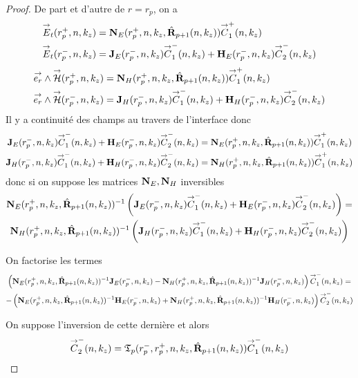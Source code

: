     \begin{proof}
      De part et d'autre de \(r=r_p\), on a 
      \begin{align*}
        {\overset{\rightarrow}{E}}_t(r_p^+,n,k_z) &= \mathbf{N}_{E}(r_p^+,n,k_z,\hat{\mathbf{R}}_{p+1}(n,k_z)){\overset{\rightarrow}{C}}_{1}^+(n,k_z)
        \\
        {\overset{\rightarrow}{E}}_t(r_p^-,n,k_z) &= \mathbf{J}_E(r_p^-,n,k_z){\overset{\rightarrow}{C}}_{1}^-(n,k_z) + \mathbf{H}_E(r_p^-,n,k_z){\overset{\rightarrow}{C}}_{2}^-(n,k_z)
      \end{align*}
      \begin{align*}
        {\overset{\rightarrow}{e_r}}\wedge{\overset{\rightarrow}{\mathcal{H}}}(r_p^+,n,k_z) &= \mathbf{N}_{H}(r_p^+,n,k_z,\hat{\mathbf{R}}_{p+1}(n,k_z)){\overset{\rightarrow}{C}}_{1}^+(n,k_z)
        \\
        {\overset{\rightarrow}{e_r}}\wedge{\overset{\rightarrow}{\mathcal{H}}}(r_p^-,n,k_z) &= \mathbf{J}_H(r_p^-,n,k_z){\overset{\rightarrow}{C}}_{1}^-(n,k_z) + \mathbf{H}_H(r_p^-,n,k_z){\overset{\rightarrow}{C}}_{2}^-(n,k_z)
      \end{align*}
      Il y a continuité des champs au travers de l'interface donc
      \begin{align*}
        \mathbf{J}_E(r_p^-,n,k_z){\overset{\rightarrow}{C}}_{1}^-(n,k_z) + \mathbf{H}_E(r_p^-,n,k_z){\overset{\rightarrow}{C}}_{2}^-(n,k_z) &= \mathbf{N}_{E}(r_p^+,n,k_z,\hat{\mathbf{R}}_{p+1}(n,k_z)){\overset{\rightarrow}{C}}_{1}^+(n,k_z)
        \\
        \mathbf{J}_H(r_p^-,n,k_z){\overset{\rightarrow}{C}}_{1}^-(n,k_z) + \mathbf{H}_H(r_p^-,n,k_z){\overset{\rightarrow}{C}}_{2}^-(n,k_z) &= \mathbf{N}_{H}(r_p^+,n,k_z,\hat{\mathbf{R}}_{p+1}(n,k_z)){\overset{\rightarrow}{C}}_{1}^+(n,k_z)
      \end{align*}
      donc si on suppose les matrices \(\mathbf{N}_E, \mathbf{N}_H\) inversibles
      \begin{multline*}
        \mathbf{N}_{E}(r_p^+,n,k_z,\hat{\mathbf{R}}_{p+1}(n,k_z))^{-1}\left(\mathbf{J}_E(r_p^-,n,k_z){\overset{\rightarrow}{C}}_{1}^-(n,k_z) + \mathbf{H}_E(r_p^-,n,k_z){\overset{\rightarrow}{C}}_{2}^-(n,k_z)\right) =
        \\
        \mathbf{N}_{H}(r_p^+,n,k_z,\hat{\mathbf{R}}_{p+1}(n,k_z))^{-1}\left(\mathbf{J}_H(r_p^-,n,k_z){\overset{\rightarrow}{C}}_{1}^-(n,k_z) + \mathbf{H}_H(r_p^-,n,k_z){\overset{\rightarrow}{C}}_{2}^-(n,k_z)\right)
      \end{multline*}

      On factorise les termes
      \begin{multline*}
        \left(\mathbf{N}_{E}(r_p^+,n,k_z,\hat{\mathbf{R}}_{p+1}(n,k_z))^{-1}\mathbf{J}_E(r_p^-,n,k_z) - \mathbf{N}_{H}(r_p^+,n,k_z,\hat{\mathbf{R}}_{p+1}(n,k_z))^{-1}\mathbf{J}_H(r_p^-,n,k_z)\right){\overset{\rightarrow}{C}}_{1}^-(n,k_z) =
        \\
        -\left(\mathbf{N}_{E}(r_p^+,n,k_z,\hat{\mathbf{R}}_{p+1}(n,k_z))^{-1}\mathbf{H}_E(r_p^-,n,k_z) + \mathbf{N}_{H}(r_p^+,n,k_z,\hat{\mathbf{R}}_{p+1}(n,k_z))^{-1}\mathbf{H}_H(r_p^-,n,k_z)\right){\overset{\rightarrow}{C}}_{2}^-(n,k_z)
      \end{multline*}

      On suppose l'inversion de cette dernière et alors
      \begin{equation*}
        {\overset{\rightarrow}{C}}_{2}^-(n,k_z) = \mathfrak{T}_p(r_p^-,r_p^+,n,k_z,\hat{\mathbf{R}}_{p+1}(n,k_z)) {\overset{\rightarrow}{C}}_{1}^-(n,k_z)
      \end{equation*}
    \end{proof}

